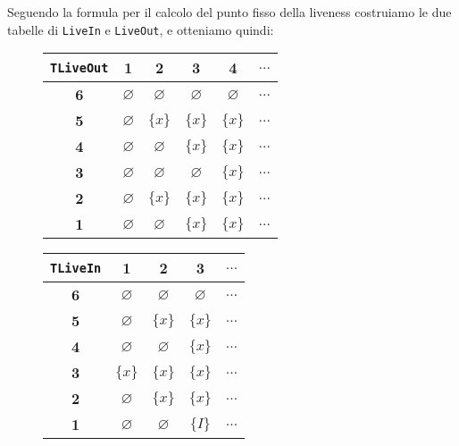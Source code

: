     Seguendo la formula per il calcolo del punto fisso della liveness 
    costruiamo le due tabelle di \texttt{LiveIn} e \texttt{LiveOut},
    e otteniamo quindi:

\begin{minipage}{0.5\textwidth}
    \begin{figure}[H]
        \centering
        \begin{tabular}{|c|c|c|c|c|c|}
            \hline
            \texttt{TLiveOut}& \textbf{1} & \textbf{2} & \textbf{3} & \textbf{4} & \textbf{$\dots$} \\
            \hline 
            \textbf{6} & $\varnothing$ & $\varnothing$ & $\varnothing$ & $\varnothing$ & $\dots$ \\
            \hline
            \textbf{5} & $\varnothing$ & $\{x\}$ & $\{x\}$ & $\{x\}$ & $\dots$ \\
            \hline
            \textbf{4} & $\varnothing$ & $\varnothing$ & $\{x\}$ 
            & $\{x\}$ & $\dots$ \\
            \hline
            \textbf{3} & $\varnothing$ &$\varnothing$ & $\varnothing$ & $\{x\}$ & $\dots$ \\
            \hline
            \textbf{2} & $\varnothing$ & $\{x\}$ & $\{x\}$  & $\{x\}$ & $\dots$ \\
            \hline
            \textbf{1} & $\varnothing$  & $\varnothing$ & $\{x\}$ & $\{x\}$ & $\dots$ \\
            \hline
        \end{tabular}
    \end{figure}
\end{minipage}
\begin{minipage}{0.5\textwidth}
    \begin{figure}[H]
        \centering
        \begin{tabular}{|c|c|c|c|c|}
            \hline
            \texttt{TLiveIn}& \textbf{1} & \textbf{2} & \textbf{3} & \textbf{$\dots$} \\
            \hline
            \textbf{6} &$\varnothing$ & $\varnothing$ & $\varnothing$ & $\dots$ \\
            \hline
            \textbf{5} & $\varnothing$ & $\{x\}$ & $\{x\}$ & $\dots$ \\
            \hline
            \textbf{4} & $\varnothing$ &$\varnothing$ & $\{x\}$ & $\dots$ \\
            \hline
            \textbf{3} & $\{x\}$ & $\{x\}$ & $\{x\}$  & $\dots$ \\
            \hline
            \textbf{2} & $\varnothing$  & $\{x\}$ & $\{x\}$ & $\dots$ \\
            \hline
            \textbf{1} & $\varnothing$  & $\varnothing$ & $\{I\}$ & $\dots$ \\
            \hline
        \end{tabular}
    \end{figure}
\end{minipage}


